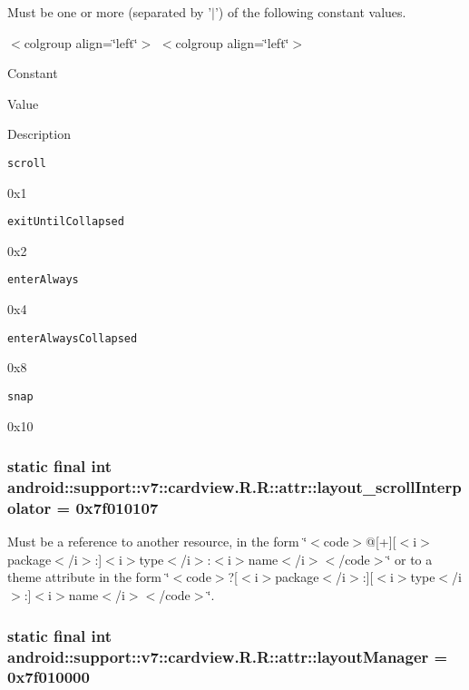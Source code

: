 Must be one or more (separated by '$|$') of the following constant values. \begin{TabularC}{0}
\hline
\end{TabularC}
$<$colgroup align=\char`\"{}left\char`\"{}$>$ $<$colgroup align=\char`\"{}left\char`\"{}$>$ 

Constant

Value

Description 

{\tt scroll}

0x1

{\tt exitUntilCollapsed}

0x2

{\tt enterAlways}

0x4

{\tt enterAlwaysCollapsed}

0x8

{\tt snap}

0x10\hypertarget{classandroid_1_1support_1_1v7_1_1cardview_1_1_r_1_1attr_6bd65db38899f82a9e53033f329243ee}{
\subsubsection[{layout\_\-scrollInterpolator}]{\setlength{\rightskip}{0pt plus 5cm}static final int android::support::v7::cardview.R.R::attr::layout\_\-scrollInterpolator = 0x7f010107}}
\label{classandroid_1_1support_1_1v7_1_1cardview_1_1_r_1_1attr_6bd65db38899f82a9e53033f329243ee}


Must be a reference to another resource, in the form \char`\"{}$<$code$>$@\mbox{[}+\mbox{]}\mbox{[}$<$i$>$package$<$/i$>$:\mbox{]}$<$i$>$type$<$/i$>$:$<$i$>$name$<$/i$>$$<$/code$>$\char`\"{} or to a theme attribute in the form \char`\"{}$<$code$>$?\mbox{[}$<$i$>$package$<$/i$>$:\mbox{]}\mbox{[}$<$i$>$type$<$/i$>$:\mbox{]}$<$i$>$name$<$/i$>$$<$/code$>$\char`\"{}. \hypertarget{classandroid_1_1support_1_1v7_1_1cardview_1_1_r_1_1attr_5cc6a8c004ddc7d7bf14401c9725f82d}{
\subsubsection[{layoutManager}]{\setlength{\rightskip}{0pt plus 5cm}static final int android::support::v7::cardview.R.R::attr::layoutManager = 0x7f010000}}
\label{classandroid_1_1support_1_1v7_1_1cardview_1_1_r_1_1attr_5cc6a8c004ddc7d7bf14401c9725f82d}


